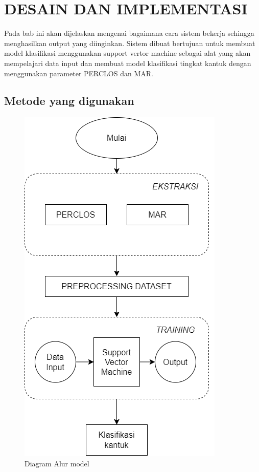 \chapter{DESAIN DAN IMPLEMENTASI}
\label{chap:desainimplementasi}


Pada bab ini akan dijelaskan mengenai bagaimana cara sistem bekerja sehingga menghasilkan output yang diinginkan. Sistem dibuat bertujuan untuk membuat model klasifikasi menggunakan support vertor machine sebagai alat yang akan mempelajari data input dan membuat model klasifikasi tingkat kantuk dengan menggunakan parameter PERCLOS dan MAR.

\section{Metode yang digunakan}
\label{sec:Metode} 


\begin{figure} [H] \centering
  \includegraphics[scale=0.45]{gambar/2_2_7.png}
  \caption{Diagram Alur model}
  \label{fig:Diagram}
\end{figure}

